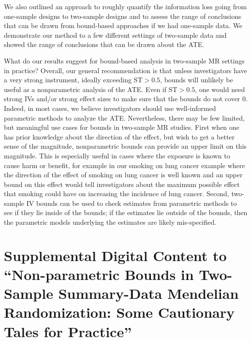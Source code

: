 \documentclass[
]{article}
\theoremstyle{plain}
\begin{document}
We also outlined an approach to roughly quantify the information loss going from one-sample designs to two-sample designs and to assess the range of conclusions that can be drawn from bound-based approaches if we had one-sample data. We demonstrate our method to a few different settings of two-sample data and showed the range of conclusions that can be drawn about the ATE.

What do our results suggest for bound-based analysis in two-sample MR settings in practice? Overall, our general recommendation is that unless investigators have a very strong instrument, ideally exceeding \(\text{ST} > 0.5\), bounds will unlikely be useful as a nonparametric analysis of the ATE. Even if \(\text{ST} > 0.5\), one would need strong IVs and/or strong effect sizes to make sure that the bounds do not cover \(0\). Indeed, in most cases, we believe investigators should use well-informed parametric methods to analyze the ATE. Nevertheless, there may be few limited, but meaningful use cases for bounds in two-sample MR studies. First when one has prior knowledge about the direction of the effect, but wish to get a better sense of the magnitude, nonparametric bounds can provide an upper limit on this magnitude. This is especially useful in cases where the exposure is known to cause harm or benefit, for example in our smoking on lung cancer example where the direction of the effect of smoking on lung cancer is well known and an upper bound on this effect would tell investigators about the maximum possible effect that smoking could have on increasing the incidence of lung cancer. Second, two-sample IV bounds can be used to check estimates from parametric methods to see if they lie inside of the bounds; if the estimates lie outside of the bounds, then the parametric models underlying the estimates are likely mis-specified.

\newpage

\printbibliography

\newpage

\setcounter{page}{1}

\setcounter{table}{0}
\setcounter{figure}{0}

\renewcommand{\tablename}{eTable}
\renewcommand{\figurename}{eFigure}

\hypertarget{appendix-appendix}{%
\appendix}


\hypertarget{supplemental-digital-content-to-non-parametric-bounds-in-two-sample-summary-data-mendelian-randomization-some-cautionary-tales-for-practice}{%
\section{Supplemental Digital Content to ``Non-parametric Bounds in Two-Sample Summary-Data Mendelian Randomization: Some Cautionary Tales for Practice''}\label{supplemental-digital-content-to-non-parametric-bounds-in-two-sample-summary-data-mendelian-randomization-some-cautionary-tales-for-practice}}
\end{document}
